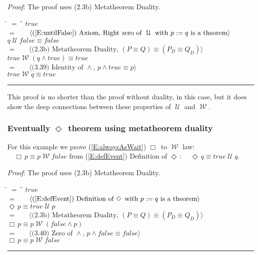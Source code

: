 \documentclass[12pt, fleqn, leqno]{article}
\newcommand{\lgap}{2pt}                             %
\newcommand{\mymathindent}{24pt}                    %
\newcommand{\Until}{\;\mathcal{U}\;}
\newcommand{\Wait}{\;\mathcal{W}\;}
\newcommand{\Event}{\Diamond\,}
\newcommand{\Always}{\Box\,}
\newcommand{\myqed}{\rule[-.23ex]{1.2ex}{2.0ex}}
\newcommand{\myqedtab}{\hspace{384pt}}              %
\newcommand{\Gll} {\langle}                         %
\newcommand{\Ggg} {\rangle}                         %
\newcommand{\Hint}[1]     {\ \ \ $\Gll              \mbox{#1} \Ggg$ }   %
\begin{document}
 \emph{Proof}: The proof uses (2.3b) Metatheorem Duality.
\begin{tabbing}
\hspace{\mymathindent} \= $= \;$ \= \myqedtab \= \kill
  \> \>   $true$\\[\lgap]
  \> $=$  \>  \Hint{(\ref{E:untilFalse}) Axiom, Right zero of $\Until$ with $p:=q$ is a theorem}\\[\lgap]
  \> \>   $q \Until false \equiv false$\\[\lgap]
    \> $=$  \>  \Hint{(2.3b) Metatheorem Duality, $(P \equiv Q) \equiv (P_D \equiv Q_D)$}\\[\lgap]
    \> \>   $true \Wait (q \land true) \equiv true$\\[\lgap]
\> $=$ \> \Hint{(3.39) Identity of $\land$, $p\land true \equiv p$} \\[\lgap]
\> \> $true \Wait q \equiv true$ \quad \myqed
\end{tabbing}

This proof is no shorter than the proof without duality, in this case, but it does show the
deep connections between these properties of $\Until$ and $\Wait$.

\subsubsection*{Eventually $\Event$ theorem using metatheorem duality}\label{section-duality-eventually}

For this example we prove (\ref{E:alwaysAsWait}) $\Always$ to $\Wait$ law: $\quad \Always p \equiv p \Wait false$
from (\ref{E:defEvent}) Definition of $\Event$: $\quad \Event q \equiv true \Until q$.

\emph{Proof}: The proof uses (2.3b) Metatheorem Duality.
\begin{tabbing}
\hspace{\mymathindent} \= $= \;$ \= \myqedtab \= \kill
  \> \>   $true$\\[\lgap]
  \> $=$  \>  \Hint{(\ref{E:defEvent}) Definition of $\Event$ with $p:=q$ is a theorem}\\[\lgap]
  \> \>   $\Event p \equiv true \Until p$\\[\lgap]
    \> $=$  \>  \Hint{(2.3b) Metatheorem Duality, $(P \equiv Q) \equiv (P_D \equiv Q_D)$}\\[\lgap]
    \> \>   $\Always p \equiv p \Wait (false \land p)$\\[\lgap]
\> $=$ \> \Hint{(3.40) Zero of $\land$, $p\land false\equiv false$} \\[\lgap]
\> \> $\Always p \equiv p \Wait false $ \quad \myqed
\end{tabbing}
\end{document}
